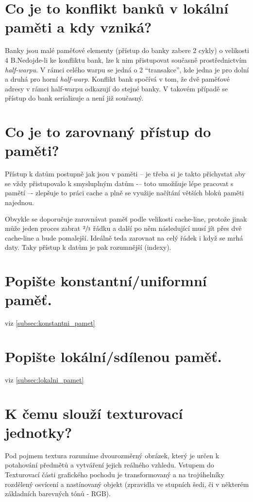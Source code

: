 \section{Co je to konflikt banků v lokální paměti a kdy vzniká?}
	Banky jsou malé paměťové elementy (přístup do banky zabere 2 cykly) o velikosti 4 B.Nedojde-li ke konfliktu bank, lze k nim přistupovat současně prostřednictvím \emph{half-warpu}. V rámci celého warpu se jedná o 2 “transakce”, kde jedna je pro dolní a druhá pro horní \emph{half-warp}. Konflikt bank spočívá v tom, že dvě paměťové adresy v rámci half-warpu odkazují do stejné banky. V takovém případě se přístup do bank serializuje a není již současný.


\section{Co je to zarovnaný přístup do paměti?}
	Přístup k datům postupně jak jsou v paměti – je třeba si je takto přichystat aby se vždy přistupovalo k smysluplným datům -– toto umožňuje lépe pracovat s pamětí –- zlepšuje to práci cache a plně se využije načítání větších bloků paměti najednou.
	
	Obvykle se doporučuje zarovnávat paměť podle velikosti cache-line, protože jinak může jeden proces zabrat $\sfrac{2}{3}$ řádku a další po něm následující musí jít přes dvě cache-line a bude pomalejší. Ideálně teda zarovnat na celý řádek i když se mrhá daty. Taky přístup k datům je pak rozumnější (indexy).
	


\section{Popište konstantní/uniformní paměť.}
	viz \ref{subsec:konstantni_pamet}


\section{Popište lokální/sdílenou paměť.}
	viz \ref{subsec:lokalni_pamet}


\section{K čemu slouží texturovací jednotky?}	
	Pod pojmem textura rozumíme dvourozměrný obrázek, který je určen k potahování předmětů a vytváření jejich reálného vzhledu. Vstupem do Texturovací části grafického pochodu je transformovaný a na trojúhelníky rozdělený osvícení a nastínovaný objekt (zpravidla ve stupních šedi, či v některém základních barevných tónů - RGB).
	
